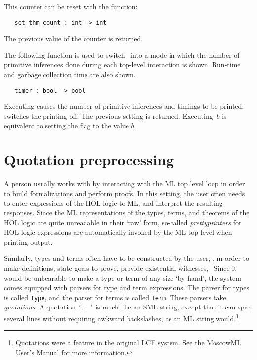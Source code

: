 \noindent This counter can be reset with the function:

\begin{boxed}
\begin{verbatim}
   set_thm_count : int -> int
\end{verbatim}\end{boxed}

\noindent The previous value of the counter is returned.

The following function is used to switch \ML\ into a  mode in  which the number
of primitive inferences done during each top-level interaction is  shown.
Run-time and garbage collection time are also shown.

\begin{boxed}
\begin{verbatim}
   timer : bool -> bool
\end{verbatim}\end{boxed}

\noindent Executing  causes  the number  of primitive inferences
and timings to be  printed;  switches  the printing  off.  The
previous setting  is
returned.    Executing  $\ b$  is equivalent to
setting the flag  to the value $b$.


\section{Quotation preprocessing}

A person usually works with \holn{} by interacting with the ML top level
loop in order to build formalizations and perform proofs. In this
setting, the user often needs to enter expressions of the HOL logic to
ML, and interpret the resulting responses. Since the ML representations
of the types, terms, and theorems of the HOL logic are quite unreadable
in their `raw' form, so-called {\it prettyprinters\/} for HOL logic
expressions are automatically invoked by the ML top level when printing
output.
 
Similarly, types and terms often have to be constructed by the user,
\eg, in order to make definitions, state goals to prove, provide
existential witnesses, \etc\ Since it would be unbearable to make a type
or term of any size `by hand', the system comes equipped with parsers
for type and term expressions. The parser for types is called
\verb+Type+, and the parser for terms is called \verb+Term+. These
parsers take {\it quotations\/}.  A quotation {\tt `}$\ldots$ {\tt `} is
much like an SML string, except that it can span several lines without
requiring awkward backslashes, as an ML string
would.\footnote{Quotations were a feature in the original LCF
system. See the MoscowML User's Manual for more information.}

